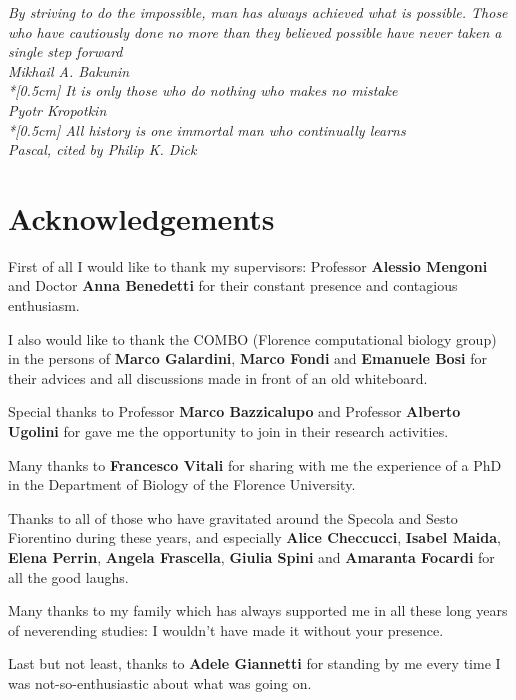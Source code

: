 
\thispagestyle{empty}

\begin{flushright}{\slshape
	\textit{By striving to do the impossible, man has always achieved what is possible. Those who have cautiously done no more than they believed possible have never taken a single step forward} \\
	Mikhail A. Bakunin\\*[0.5cm]
	\textit{It is only those who do nothing who makes no mistake} \\
	Pyotr Kropotkin\\*[0.5cm]
	\textit{All history is one immortal man who continually learns} \\
	Pascal, cited by Philip K. Dick \\
	}
\end{flushright}



\newpage

\begingroup
\let\clearpage\relax
\let\cleardoublepage\relax
\let\cleardoublepage\relax

\chapter{Acknowledgements}

{\small
First of all I would like to thank my supervisors: Professor \textbf{Alessio Mengoni} and Doctor \textbf{Anna Benedetti} for their constant presence and contagious enthusiasm.

\noindent I also would like to thank the COMBO (Florence computational biology group) in the persons of \textbf{Marco Galardini}, \textbf{Marco Fondi} and \textbf{Emanuele Bosi} for their advices and all discussions made in front of an old whiteboard. 

\noindent Special thanks to Professor \textbf{Marco Bazzicalupo} and Professor \textbf{Alberto Ugolini} for gave me the opportunity to join in their research activities.

\noindent Many thanks to \textbf{Francesco Vitali} for sharing with me the experience of a PhD in the Department of Biology of the Florence University.

\noindent Thanks to all of those who have gravitated around the Specola and Sesto Fiorentino during these years, and especially \textbf{Alice Checcucci}, \textbf{Isabel Maida}, \textbf{Elena Perrin}, \textbf{Angela Frascella}, \textbf{Giulia Spini} and \textbf{Amaranta Focardi} for all the good laughs.

\noindent Many thanks to my family which has always supported me in all these long years of neverending studies: I wouldn't have made it without your presence.

\noindent Last but not least, thanks to \textbf{Adele Giannetti} for standing by me every time I was not-so-enthusiastic about what was going on.}

\endgroup



